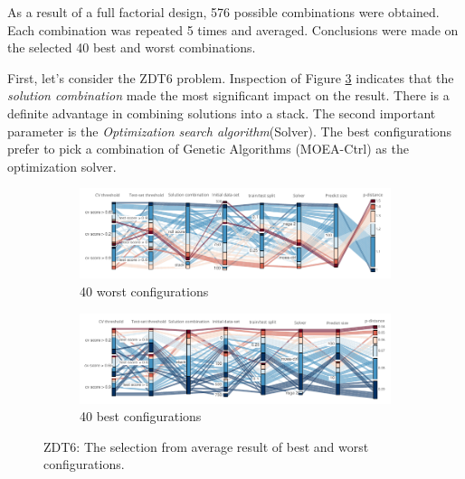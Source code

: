     As a result of a full factorial design, 576 possible combinations were obtained. Each combination was repeated 5 times and averaged. Conclusions were made on the selected 40 best and worst combinations.

    First, let's consider the ZDT6 problem. Inspection of Figure \ref{fig:conf_zdt6} indicates that the \emph{solution combination} made the most significant impact on the result.  There is a definite advantage in combining solutions into a stack. The second important parameter is the \emph{Optimization search algorithm}(Solver). The best configurations prefer to pick a combination of Genetic Algorithms (MOEA-Ctrl) as the optimization solver.

        \begin{figure}
            \centering
            \begin{subfigure}{\textwidth}
                \includegraphics[width=\textwidth]{content/images/conf_zdt6_worst}
                \caption{40 worst configurations}
                \label{fig:conf_zdt6_worst}
            \end{subfigure} 
            
            \begin{subfigure}{\textwidth}
                \includegraphics[width=\textwidth]{content/images/conf_zdt6_best}
                \caption{40 best configurations}
                \label{fig:conf_zdt6_best}
            \end{subfigure}   
            \caption[ZDT6: The selection from average result of best and worst configurations.]{ZDT6: The selection from average result of best and worst configurations.}
            \label{fig:conf_zdt6}    
        \end{figure}
    
